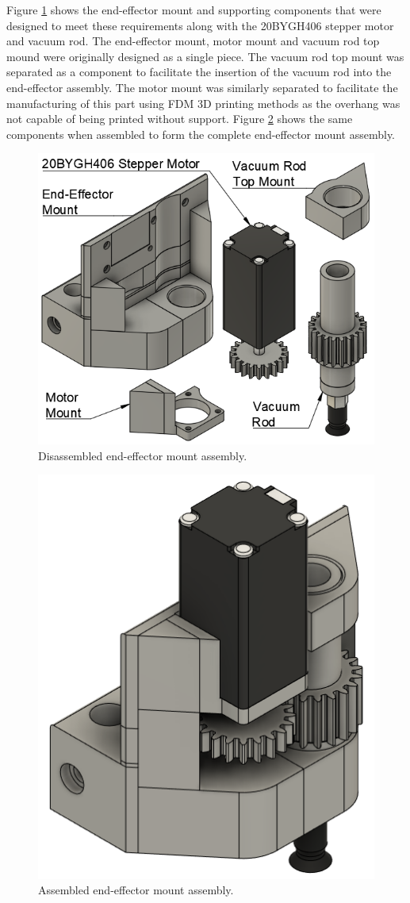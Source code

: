 Figure \ref{fig:end-effector-disassembled} shows the end-effector mount and supporting components that were designed to meet these requirements along with the 20BYGH406 stepper motor and vacuum rod. The end-effector mount, motor mount and vacuum rod top mound were originally designed as a single piece. The vacuum rod top mount was separated as a component to facilitate the insertion of the vacuum rod into the end-effector assembly. The motor mount was similarly separated to facilitate the manufacturing of this part using FDM 3D printing methods as the overhang was not capable of being printed without support. Figure \ref{fig:end-effector-assembled} shows the same components when assembled to form the complete end-effector mount assembly.

\begin{figure}[H]
	\centering
	\includegraphics[width=0.6\linewidth]{figures/end-effector-disassembled.png}
	\caption{Disassembled end-effector mount assembly.}
	\label{fig:end-effector-disassembled}
\end{figure}

\begin{figure}[H]
	\centering
	\includegraphics[width=0.3\linewidth]{figures/end-effector-assembled.png}
	\caption{Assembled end-effector mount assembly.}
	\label{fig:end-effector-assembled}
\end{figure}

